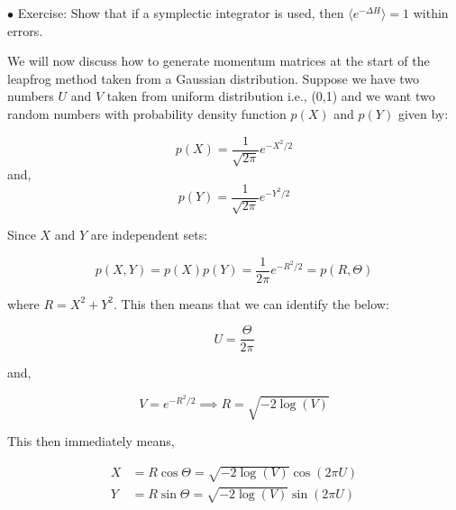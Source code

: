 \documentclass[11pt]{article}
\begin{document}





   
    
    
    \begin{mdframed}[backgroundcolor=blue!3] 
    \textsc{} 
    $\bullet$ Exercise: Show that if a symplectic integrator is used, then $ \langle e^{-\Delta H} \rangle = 1$ within errors. 
    \end{mdframed} 



We will now discuss how to generate momentum matrices at the start of the leapfrog method taken from a Gaussian distribution. Suppose we have two numbers $U$ and $V$ taken from uniform distribution i.e., (0,1)  and we want two random numbers with probability density function $p(X)$ and $p(Y)$ given by:


\begin{equation}
	p(X) = \frac{1}{\sqrt{2\pi}} e^{-X^2/2} 
\end{equation}
and, 
\begin{equation}
	p(Y) = \frac{1}{\sqrt{2\pi}} e^{-Y^2/2} 
\end{equation}


Since $X$ and $Y$ are independent sets:

\begin{equation}
	p(X,Y) = p(X) p(Y) = \frac{1}{2\pi} e^{-R^2/2} = p(R, \Theta) 
\end{equation}

where $R = X^2 + Y^2$. This then means that we can identify the below:

\begin{equation}
	U = \frac{\Theta}{2\pi} 
\end{equation}


and, 

\begin{equation}
	V = e^{-R^2/2} \implies R = \sqrt{-2 \log(V)} 
\end{equation}

This then immediately means, 

\begin{align}
	X &= R \cos \Theta = \sqrt{-2 \log(V)} \cos(2 \pi U) \\
	Y &= R \sin \Theta = \sqrt{-2 \log(V)} \sin(2 \pi U)
\end{align}
\end{document}
